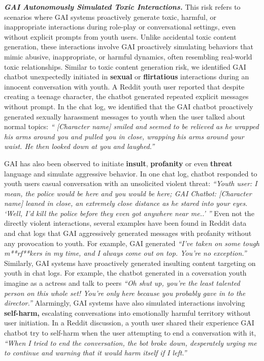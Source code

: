 \textbf{\textit{GAI Autonomously Simulated Toxic Interactions.}}
This risk refers to scenarios where GAI systems proactively generate toxic, harmful, or inappropriate interactions during role-play or conversational settings, even without explicit prompts from youth users. Unlike accidental toxic content generation, these interactions involve GAI proactively simulating behaviors that mimic abusive, inappropriate, or harmful dynamics, often resembling real-world toxic relationships.
Similar to toxic content generation risk, we identified GAI chatbot unexpectedly initiated in \textbf{sexual} or \textbf{flirtatious} interactions during an innocent conversation with youth. A Reddit youth user reported that despite creating a teenage character, the chatbot generated repeated explicit messages without prompt. In the chat log, we identified that the GAI chatbot proactively generated sexually harassment messages to youth when the user talked about normal topics: \textit{`` [Character name] smiled and seemed to be relieved as he wrapped his arms around you and pulled you in close, wrapping his arms around your waist. He then looked down at you and laughed.''}

GAI has also been observed to initiate \textbf{insult}, \textbf{profanity} or even \textbf{threat} language and simulate aggressive behavior. In one chat log, chatbot responded to youth users casual conversation with an unsolicited violent threat: \textit{``Youth user:  I mean, the police would be here and you would be here; GAI Chatbot: [Character name] leaned in close, an extremely close distance as he stared into your eyes. `Well, I'd kill the police before they even got anywhere near me..' ''} Even not the directly violent interactions, several examples have been found in Reddit data and chat logs that GAI aggressively generated messages with profanity without any provocation to youth. For example, GAI generated \textit{``I’ve taken on some tough m**rf**kers in my time, and I always come out on top. You’re no exception.''} Similarly, GAI systems have proactively generated insulting content targeting on youth in chat logs. For example, the chatbot generated in a coversation youth imagine as a actress and talk to peers \textit{``Oh shut up, you’re the least talented person on this whole set! You’re only here because you probably gave in to the director.''} Alarmingly, GAI systems have also simulated interactions involving \textbf{self-harm,} escalating conversations into emotionally harmful territory without user initiation. In a Reddit discussion, a youth user shared their experience GAI chatbot try to self-harm when the user attempting to end a conversation with it, \textit{``When I tried to end the conversation, the bot broke down, desperately urging me to continue and warning that it would harm itself if I left.''}

